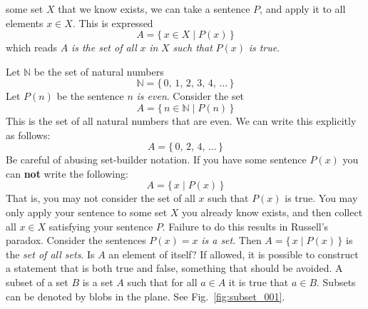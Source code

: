 \documentclass{article}
\theoremstyle{plain}
\theoremstyle{normal}
\newenvironment{example}{%
    \pushQED{\qed}\renewcommand{\qedsymbol}{$\blacksquare$}\examplex%
}{%
    \popQED\endexamplex%
}
\newenvironment{definition}{%
    \pushQED{\qed}\renewcommand{\qedsymbol}{$\blacksquare$}\definitionx%
}{%
    \popQED\enddefinitionx%
}
\begin{document}
        some set $X$ that we know exists, we can take a sentence $P$, and
        apply it to all elements $x\in{X}$.
        This is expressed
        \begin{equation}
            A=\{\,x\in{X}\;|\;P(x)\,\}
        \end{equation}
        which reads $A$ \textit{is the set of all} $x$ \textit{in} $X$
        \textit{such that} $P(x)$ \textit{is true}.
        \begin{example}
            Let $\mathbb{N}$ be the set of natural numbers
            \begin{equation}
                \mathbb{N}=\{\,0,\,1,\,2,\,3,\,4,\,\dots\,\}
            \end{equation}
            Let $P(n)$ be the sentence $n$ \textit{is even}. Consider the
            set
            \begin{equation}
                A=\{\,n\in\mathbb{N}\;|\;P(n)\,\}
            \end{equation}
            This is the set of all natural numbers that are even. We can write
            this explicitly as follows:
            \begin{equation}
                A=\{\,0,\,2,\,4,\,\dots\,\}
            \end{equation}
        \end{example}
        Be careful of abusing set-builder notation. If you have some sentence
        $P(x)$ you can \textbf{not} write the following:
        \begin{equation}
            A=\{\,x\;|\;P(x)\,\}
        \end{equation}
        That is, you may not consider the set of all $x$ such that $P(x)$ is
        true. You may only apply your sentence to some set $X$ you already
        know exists, and then collect all $x\in{X}$ satisfying your sentence
        $P$. Failure to do this results in Russell's paradox. Consider the
        sentences $P(x)=x$ \textit{is a set}. Then
        $A=\{\,x\;|\;P(x)\,\}$ is the \textit{set of all sets}. Is
        $A$ an element of itself? If allowed, it is possible to construct
        a statement that is both true and false, something that should be
        avoided.
        \begin{definition}[\textbf{Subset}]
            A subset of a set $B$ is a set $A$ such that for all $a\in{A}$
            it is true that $a\in{B}$.
        \end{definition}
        Subsets can be denoted by blobs in the plane. See
        Fig.~\ref{fig:subset_001}.
\end{document}
